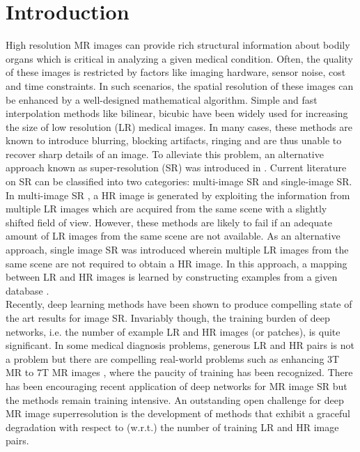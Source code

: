 \documentclass{article}
\begin{document}
\section{Introduction}
\label{sec:intro}
\vspace{-.3cm}
High resolution MR images can provide rich structural information about bodily organs which is critical in analyzing a given medical condition. Often, the quality of these images is restricted by factors like imaging hardware, sensor noise, cost and time constraints. In such scenarios, the spatial resolution of these images can be enhanced by a well-designed mathematical algorithm. Simple and fast interpolation methods like bilinear, bicubic \cite{lehmann1999survey} have been widely used for increasing the size of low resolution (LR) medical images. In many cases, these methods are known to introduce blurring, blocking artifacts, ringing and are thus unable to recover sharp details of an image. To alleviate this problem, an alternative approach known as super-resolution (SR) was introduced in \cite{tsai1984multiframe}. Current literature on SR can be classified into two categories: multi-image SR and single-image SR.\\
In multi-image SR \cite{tsai1984multiframe, farsiu2004fast}, a HR image is generated by exploiting the information from multiple LR images which are acquired from the same scene with a slightly shifted field of view. However, these methods are likely to fail if an adequate amount of LR images from the same scene are not available. As an alternative approach, single image SR was introduced wherein multiple LR images from the same scene are not required to obtain a HR image. In this approach, a mapping between LR and HR images is learned by constructing examples from a given database \cite{trinh2014novel, freeman2002example, chang2004super, yang2010image, bahrami2016reconstruction}. \\
Recently, deep learning methods have been shown to produce compelling state of the art results \cite{dong2016image,kim2016accurate,guo2017deep,wang2015deep,dong2016accelerating,timofte2017ntire,kim2016deeply} for image SR.  Invariably though, the training burden of deep networks, i.e. the number of example LR and HR images (or patches), is quite significant. In some medical diagnosis problems, generous LR and HR pairs is not a problem but there are compelling real-world problems such as enhancing 3T MR to 7T MR images \cite{bahrami2016reconstruction}, where the paucity of training has been recognized.  There has been encouraging recent application of deep networks for MR image SR \cite{yang2016super, srinivasan2017super} but the methods remain training intensive. An outstanding open challenge for deep MR image superresolution is the development of methods that exhibit a graceful degradation with respect to (w.r.t.) the number of training LR and HR image pairs. \\
\end{document}
